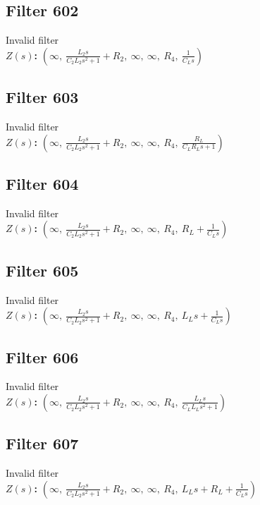 \documentclass{article}
\begin{document}
\subsection*{Filter 602}
Invalid filter \\ 
\textbf{$Z(s)$:} $\left( \infty, \  \frac{L_{2} s}{C_{2} L_{2} s^{2} + 1} + R_{2}, \  \infty, \  \infty, \  R_{4}, \  \frac{1}{C_{L} s}\right)$ \\ 
\subsection*{Filter 603}
Invalid filter \\ 
\textbf{$Z(s)$:} $\left( \infty, \  \frac{L_{2} s}{C_{2} L_{2} s^{2} + 1} + R_{2}, \  \infty, \  \infty, \  R_{4}, \  \frac{R_{L}}{C_{L} R_{L} s + 1}\right)$ \\ 
\subsection*{Filter 604}
Invalid filter \\ 
\textbf{$Z(s)$:} $\left( \infty, \  \frac{L_{2} s}{C_{2} L_{2} s^{2} + 1} + R_{2}, \  \infty, \  \infty, \  R_{4}, \  R_{L} + \frac{1}{C_{L} s}\right)$ \\ 
\subsection*{Filter 605}
Invalid filter \\ 
\textbf{$Z(s)$:} $\left( \infty, \  \frac{L_{2} s}{C_{2} L_{2} s^{2} + 1} + R_{2}, \  \infty, \  \infty, \  R_{4}, \  L_{L} s + \frac{1}{C_{L} s}\right)$ \\ 
\subsection*{Filter 606}
Invalid filter \\ 
\textbf{$Z(s)$:} $\left( \infty, \  \frac{L_{2} s}{C_{2} L_{2} s^{2} + 1} + R_{2}, \  \infty, \  \infty, \  R_{4}, \  \frac{L_{L} s}{C_{L} L_{L} s^{2} + 1}\right)$ \\ 
\subsection*{Filter 607}
Invalid filter \\ 
\textbf{$Z(s)$:} $\left( \infty, \  \frac{L_{2} s}{C_{2} L_{2} s^{2} + 1} + R_{2}, \  \infty, \  \infty, \  R_{4}, \  L_{L} s + R_{L} + \frac{1}{C_{L} s}\right)$ \\ 
\end{document}
